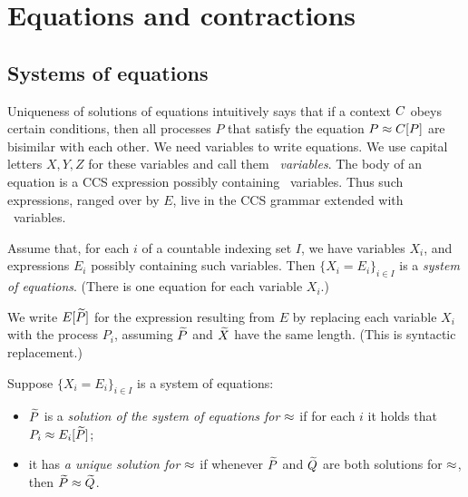 \section{Equations and contractions}
\label{s:eq}

\subsection{Systems of  equations}
\label{ss:SysEq}

Uniqueness of  solutions of equations \cite{Mil89} intuitively says that if  a context $C$ obeys
certain  conditions, 
then all processes $P$  that satisfy the equation $ P \approx C [P]$ are
bisimilar with each other.
We need variables to write equations. We  use
 capital
letters  $X,Y,Z$
 for  these variables and call them \emph{\behav\  variables}.
 The body of an equation is a CCS expression
possibly containing \behav\  variables. Thus such expressions, ranged
over by $E$, live in the CCS
grammar extended with \behav\  variables.

  
\begin{definition}
Assume that, for each $i$ of 
 a countable indexing set $I$, we have variables $X_i$, and expressions
$E_i$ possibly containing  such variables. 
Then 
$\{  X_i = E_i\}_{i\in I}$
is 
  a \emph{system of equations}. (There is one equation for each variable $X_i$.)
\end{definition}

We write $E[\widetilde P]$ for the expression resulting from $E$ by
replacing each variable $X_i$   with the process $P_i$, assuming
$\widetilde P$ and $\widetilde X$ have the same length. (This is syntactic
replacement.) 
\begin{definition}
Suppose  $\{  X_i = E_i\}_{i\in I}$ is a system of equations: 
\begin{itemize}
\item
 $\widetilde P$ is a \emph{solution of the 
system of equations  for $\approx$} 
if for each $i$ it holds
that $P_i \approx E_i [\widetilde P]$;

\item it %
 has \emph{a unique solution for $\approx$}  if whenever 
 $\widetilde P$ and $\widetilde Q$ are both solutions for $\approx$, then $\widetilde P \approx
 \widetilde Q$. 
\end{itemize} 
 \end{definition} 




